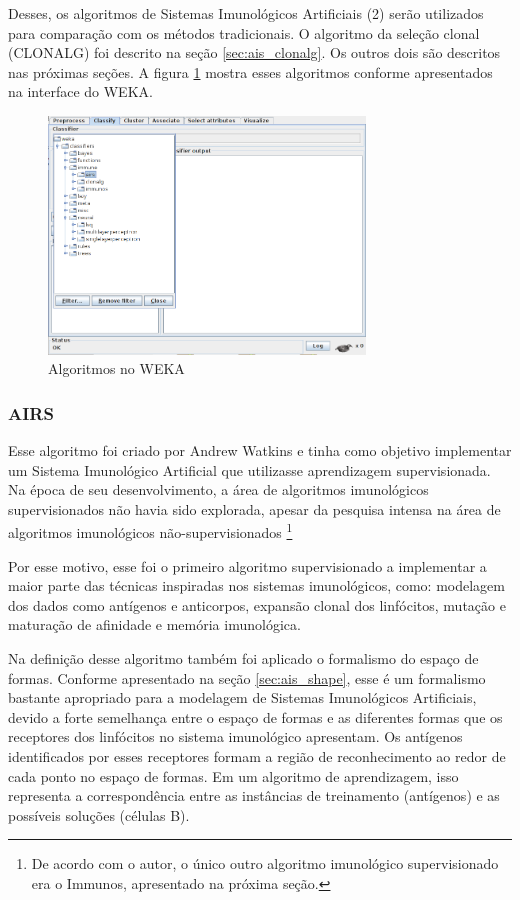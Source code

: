 Desses, os algoritmos de Sistemas Imunológicos Artificiais (2) serão utilizados para comparação com os métodos tradicionais. O algoritmo da seleção clonal (CLONALG) foi descrito na seção \ref{sec:ais_clonalg}. Os outros dois são descritos nas próximas seções. A figura \ref{fig:prop_wekaais} mostra esses algoritmos conforme apresentados na interface do WEKA.

\begin{figure}[h!]
\centering
\includegraphics[width=0.75\textwidth]{img/weka_ais.png}
\caption{Algoritmos no WEKA}
\label{fig:prop_wekaais}
\end{figure}

\subsubsection{AIRS}
\label{sec:prop_airs}

Esse algoritmo foi criado por Andrew Watkins \cite{Andrew2003} e tinha como objetivo implementar um Sistema Imunológico Artificial que utilizasse aprendizagem supervisionada. Na época de seu desenvolvimento, a área de algoritmos imunológicos supervisionados não havia sido explorada, apesar da pesquisa intensa na área de algoritmos imunológicos não-supervisionados \footnote{De acordo com o autor, o único outro algoritmo imunológico supervisionado era o Immunos, apresentado na próxima seção.}

Por esse motivo, esse foi o primeiro algoritmo supervisionado a implementar a maior parte das técnicas inspiradas nos sistemas imunológicos, como: modelagem dos dados como antígenos e anticorpos, expansão clonal dos linfócitos, mutação e maturação de afinidade e memória imunológica.

Na definição desse algoritmo também foi aplicado o formalismo do espaço de formas. Conforme apresentado na seção \ref{sec:ais_shape}, esse é um formalismo bastante apropriado para a modelagem de Sistemas Imunológicos Artificiais, devido a forte semelhança entre o espaço de formas e as diferentes formas que os receptores dos linfócitos no sistema imunológico apresentam. Os antígenos identificados por esses receptores formam a região de reconhecimento ao redor de cada ponto no espaço de formas. Em um algoritmo de aprendizagem, isso representa a correspondência entre as instâncias de treinamento (antígenos) e as possíveis soluções (células B).

